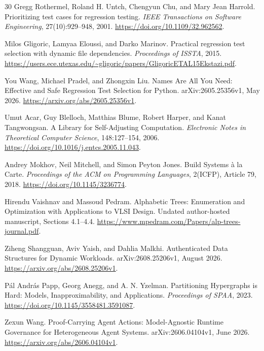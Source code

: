 \begin{thebibliography}{30}
\sloppy
{} Gregg Rothermel, Roland H. Untch, Chengyun Chu, and Mary Jean Harrold.
\newblock Prioritizing test cases for regression testing.
\newblock \emph{IEEE Transactions on Software Engineering}, 27(10):929--948, 2001.
\newblock \url{https://doi.org/10.1109/32.962562}.

 Milos Gligoric, Lamyaa Eloussi, and Darko Marinov.
\newblock Practical regression test selection with dynamic file dependencies.
\newblock \emph{Proceedings of ISSTA}, 2015.
\newblock \url{https://users.ece.utexas.edu/~gligoric/papers/GligoricETAL15Ekstazi.pdf}.

 You Wang, Michael Pradel, and Zhongxin Liu.
\newblock Names Are All You Need: Effective and Safe Regression Test Selection for Python.
\newblock arXiv:2605.25356v1, May 2026.
\newblock \url{https://arxiv.org/abs/2605.25356v1}.

 Umut Acar, Guy Blelloch, Matthias Blume, Robert Harper, and Kanat Tangwongsan.
\newblock A Library for Self-Adjusting Computation.
\newblock \emph{Electronic Notes in Theoretical Computer Science}, 148:127--154, 2006.
\newblock \url{https://doi.org/10.1016/j.entcs.2005.11.043}.

 Andrey Mokhov, Neil Mitchell, and Simon Peyton Jones.
\newblock Build Systems \`a la Carte.
\newblock \emph{Proceedings of the ACM on Programming Languages}, 2(ICFP), Article 79, 2018.
\newblock \url{https://doi.org/10.1145/3236774}.

 Hirendu Vaishnav and Massoud Pedram.
\newblock Alphabetic Trees: Enumeration and Optimization with Applications to VLSI Design.
\newblock Undated author-hosted manuscript, Sections 4.1--4.4.
\newblock \url{https://www.mpedram.com/Papers/alp-trees-journal.pdf}.

 Ziheng Shangguan, Aviv Yaish, and Dahlia Malkhi.
\newblock Authenticated Data Structures for Dynamic Workloads.
\newblock arXiv:2608.25206v1, August 2026.
\newblock \url{https://arxiv.org/abs/2608.25206v1}.

 P\'al Andr\'as Papp, Georg Anegg, and A. N. Yzelman.
\newblock Partitioning Hypergraphs is Hard: Models, Inapproximability, and Applications.
\newblock \emph{Proceedings of SPAA}, 2023.
\newblock \url{https://doi.org/10.1145/3558481.3591087}.

 Zexun Wang.
\newblock Proof-Carrying Agent Actions: Model-Agnostic Runtime Governance for Heterogeneous Agent Systems.
\newblock arXiv:2606.04104v1, June 2026.
\newblock \url{https://arxiv.org/abs/2606.04104v1}.


\end{thebibliography}
